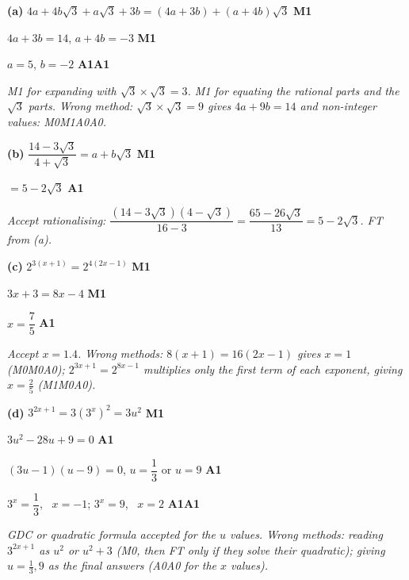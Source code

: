 \documentclass[12pt, twoside]{article}
\begin{document}
\begin{enumerate}[itemsep=0.3cm]
\textbf{(a)} $4a + 4b\sqrt{3} + a\sqrt{3} + 3b = (4a + 3b) + (a + 4b)\sqrt{3}$ \hfill \textbf{M1}

$4a + 3b = 14$, \quad $a + 4b = -3$ \hfill \textbf{M1}

$a = 5$, \quad $b = -2$ \hfill \textbf{A1A1}

\emph{M1 for expanding with $\sqrt{3} \times \sqrt{3} = 3$. M1 for
equating the rational parts and the $\sqrt{3}$ parts. Wrong method:
$\sqrt{3} \times \sqrt{3} = 9$ gives $4a + 9b = 14$ and non-integer values:
M0M1A0A0.}

\textbf{(b)} $\dfrac{14 - 3\sqrt{3}}{4 + \sqrt{3}} = a + b\sqrt{3}$ \hfill \textbf{M1}

$= 5 - 2\sqrt{3}$ \hfill \textbf{A1}

\emph{Accept rationalising:
$\dfrac{(14 - 3\sqrt{3})(4 - \sqrt{3})}{16 - 3} = \dfrac{65 - 26\sqrt{3}}{13}
= 5 - 2\sqrt{3}$. FT from (a).}

\textbf{(c)} $2^{3(x + 1)} = 2^{4(2x - 1)}$ \hfill \textbf{M1}

$3x + 3 = 8x - 4$ \hfill \textbf{M1}

$x = \dfrac{7}{5}$ \hfill \textbf{A1}

\emph{Accept $x = 1.4$. Wrong methods: $8(x + 1) = 16(2x - 1)$ gives
$x = 1$ (M0M0A0); $2^{3x + 1} = 2^{8x - 1}$ multiplies only the first term
of each exponent, giving $x = \frac{2}{5}$ (M1M0A0).}

\textbf{(d)} $3^{2x + 1} = 3\left(3^{x}\right)^{2} = 3u^{2}$ \hfill \textbf{M1}

$3u^{2} - 28u + 9 = 0$ \hfill \textbf{A1}

$(3u - 1)(u - 9) = 0$, \quad $u = \dfrac{1}{3}$ or $u = 9$ \hfill \textbf{A1}

$3^{x} = \dfrac{1}{3}$, \ $x = -1$; \quad $3^{x} = 9$, \ $x = 2$ \hfill \textbf{A1A1}

\emph{GDC or quadratic formula accepted for the $u$ values. Wrong methods:
reading $3^{2x + 1}$ as $u^{2}$ or $u^{2} + 3$ (M0, then FT only if they
solve their quadratic); giving $u = \frac{1}{3}, 9$ as the final answers
(A0A0 for the $x$ values).}

\end{enumerate}
\end{document}
